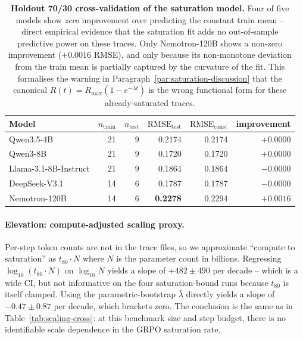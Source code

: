 \documentclass{article}
\providecommand{\tableref}[1]{Table~\ref{#1}}
\providecommand{\paragraphref}[1]{Paragraph~\ref{#1}}
\begin{document}
\begin{table}[t]
  \centering
  \small
  \begin{tabular}{lrrrrr}
    \toprule
    Model & $n_{\text{train}}$ & $n_{\text{test}}$ &
           $\text{RMSE}_{\text{test}}$ &
           $\text{RMSE}_{\text{const}}$ &
           improvement \\
    \midrule
    Qwen3.5-4B            & 21 & 9 & 0.2174 & 0.2174 & $+0.0000$ \\
    Qwen3-8B              & 21 & 9 & 0.1720 & 0.1720 & $+0.0000$ \\
    Llama-3.1-8B-Instruct & 21 & 9 & 0.1864 & 0.1864 & $-0.0000$ \\
    DeepSeek-V3.1         & 14 & 6 & 0.1787 & 0.1787 & $-0.0000$ \\
    Nemotron-120B         & 14 & 6 & \textbf{0.2278} & 0.2294 & $+0.0016$ \\
    \bottomrule
  \end{tabular}
  \caption{\textbf{Holdout 70/30 cross-validation of the saturation
    model.}  Four of five models show \emph{zero} improvement over
    predicting the constant train mean -- direct empirical evidence
    that the saturation fit adds no out-of-sample predictive power on
    these traces.  Only Nemotron-120B shows a non-zero improvement
    ($+0.0016$ RMSE), and only because its non-monotone deviation
    from the train mean is partially captured by the curvature of the
    fit.  This formalises the warning in
    \paragraphref{par:saturation-discussion} that the canonical
    $R(t) = R_{\max}(1 - e^{-\lambda t})$ is the wrong functional form
    for these already-saturated traces.}
  \label{tab:scaling-holdout}
\end{table}

\paragraph{Elevation: compute-adjusted scaling proxy.}
\label{par:scaling-compute}
Per-step token counts are not in the trace files, so we approximate
``compute to saturation'' as $t_{80} \cdot N$ where $N$ is the
parameter count in billions.  Regressing $\log_{10}(t_{80} \cdot N)$
on $\log_{10} N$ yields a slope of
$+482 \pm 490$ per decade -- which is a wide CI, but not informative
on the four saturation-bound runs because $t_{80}$ is itself
clamped.  Using the parametric-bootstrap $\bar\lambda$ directly
yields a slope of $-0.47 \pm 0.87$ per decade, which brackets zero.
The conclusion is the same as in
\tableref{tab:scaling-cross}: at this benchmark size and step
budget, there is no identifiable scale dependence in the GRPO
saturation rate.
\end{document}
